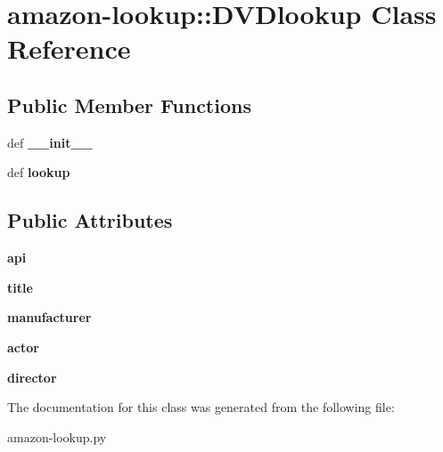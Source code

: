 \hypertarget{classamazon-lookup_1_1DVDlookup}{
\section{amazon-\/lookup::DVDlookup Class Reference}
\label{classamazon-lookup_1_1DVDlookup}
}
\subsection*{Public Member Functions}
\begin{DoxyCompactItemize}
\item 
\hypertarget{classamazon-lookup_1_1DVDlookup_a91d68106b451bc87fd1016c960451279}{
def {\bfseries \_\-\_\-init\_\-\_\-}}
\label{classamazon-lookup_1_1DVDlookup_a91d68106b451bc87fd1016c960451279}

\item 
\hypertarget{classamazon-lookup_1_1DVDlookup_a16849d60884e35ee331620043ca0bd20}{
def {\bfseries lookup}}
\label{classamazon-lookup_1_1DVDlookup_a16849d60884e35ee331620043ca0bd20}

\end{DoxyCompactItemize}
\subsection*{Public Attributes}
\begin{DoxyCompactItemize}
\item 
\hypertarget{classamazon-lookup_1_1DVDlookup_a91ebfaad6348328fa4153e4249865fd9}{
{\bfseries api}}
\label{classamazon-lookup_1_1DVDlookup_a91ebfaad6348328fa4153e4249865fd9}

\item 
\hypertarget{classamazon-lookup_1_1DVDlookup_ac5bf432100a946d2243b441c37e03ef5}{
{\bfseries title}}
\label{classamazon-lookup_1_1DVDlookup_ac5bf432100a946d2243b441c37e03ef5}

\item 
\hypertarget{classamazon-lookup_1_1DVDlookup_aba6d34b7084d64b95262e1297a0c0ca0}{
{\bfseries manufacturer}}
\label{classamazon-lookup_1_1DVDlookup_aba6d34b7084d64b95262e1297a0c0ca0}

\item 
\hypertarget{classamazon-lookup_1_1DVDlookup_ae89aefec3b4eecabbf1946e9f112e361}{
{\bfseries actor}}
\label{classamazon-lookup_1_1DVDlookup_ae89aefec3b4eecabbf1946e9f112e361}

\item 
\hypertarget{classamazon-lookup_1_1DVDlookup_a2bb4941ea69688038c0bc716b251e3e1}{
{\bfseries director}}
\label{classamazon-lookup_1_1DVDlookup_a2bb4941ea69688038c0bc716b251e3e1}

\end{DoxyCompactItemize}


The documentation for this class was generated from the following file:\begin{DoxyCompactItemize}
\item 
amazon-\/lookup.py\end{DoxyCompactItemize}
